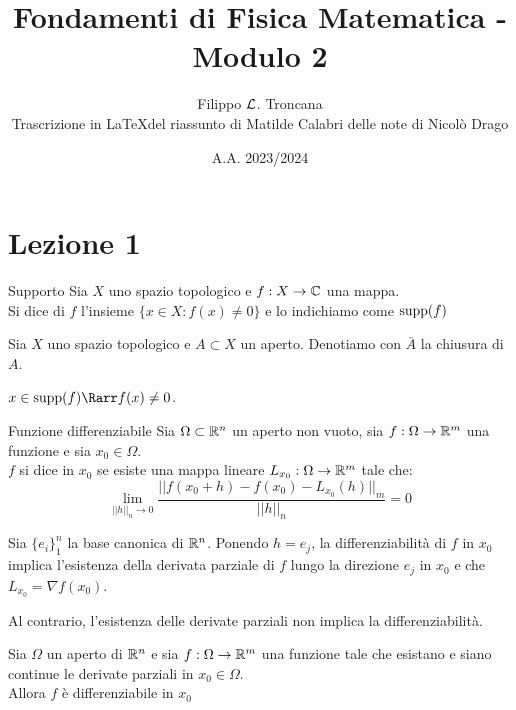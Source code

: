 \documentclass{article}
\title{Fondamenti di Fisica Matematica - Modulo 2}
\author{Filippo $\mathcal{L}$. Troncana \\ Trascrizione in \LaTeX del riassunto di Matilde Calabri delle note di Nicolò Drago}
\date{A.A. 2023/2024}
\begin{document}
\maketitle

\tableofcontents

\section{Lezione 1}

\begin{definition}{Supporto}{}
    Sia $X$ uno spazio topologico e $f:X\to\mathbb{C}$ una mappa.\\
    Si dice  di $f$ l'insieme $\{x\in X : f(x)\neq 0\}$ e lo indichiamo come $\operatorname{supp}(f)$
\end{definition}
\begin{notation}
    Sia $X$ uno spazio topologico e $A\subset X$ un aperto. Denotiamo con $\bar{A}$ la chiusura di $A$.
\end{notation}

\begin{remark}{}{}
    $x \in \supp(f) \Rarr f(x)\neq 0$.
\end{remark}

\begin{definition}{Funzione differenziabile}{}
    Sia $\Omega\subset \mathbb{R}^n$ un aperto non vuoto, sia $f:\Omega\to\mathbb{R}^m$ una funzione e sia $x_0\in\Omega$.\\
    $f$ si dice  in $x_0$ se esiste una mappa lineare $L_{x_0} : \Omega\to\mathbb{R}^m$ tale che:
    \[\lim_{||h||_n \to 0} \frac{||f(x_0 + h) - f(x_0) - L_{x_0}(h)||_m}{||h||_n} = 0\]
\end{definition}

\begin{remark}{}{}
    Sia $\{e_i\}_1^n$ la base canonica di $\mathbb{R}^n$. Ponendo $h=e_j$, la differenziabilità di $f$ in $x_0$ implica l'esistenza della derivata parziale di $f$ lungo la direzione $e_j$ in $x_0$ e che $L_{x_0} = \nabla f (x_0)$.
\end{remark}

\begin{remark}{}{}
    Al contrario, l'esistenza delle derivate parziali non implica la differenziabilità.
\end{remark}

\begin{proposition}{}{}
    Sia $\Omega$ un aperto di $\mathbb{R}^n$ e sia $f:\Omega\to\mathbb{R}^m$ una funzione tale che esistano e siano continue le derivate parziali in $x_0\in\Omega$.\\
    Allora $f$ è differenziabile in $x_0$
\end{proposition}
\end{document}
